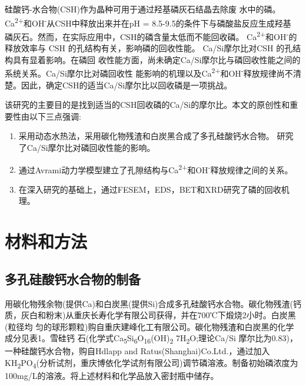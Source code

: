 \documentclass[11pt]{article}
\begin{document}
硅酸钙-水合物(CSH)作为晶种可用于通过羟基磷灰石结晶去除废
水中的磷。\cite{battistoni01_phosp_remov_from_real_anaer} Ca\textsuperscript{2+}和OH\textsuperscript{-}从CSH中释放出来并在pH = 8.5-9.5的条件下与磷酸盐反应生成羟基
磷灰石。然而，在实际应用中，CSH的磷含量太低而不能回收磷。
\cite{renman10_long_term_phosp_remov_by,de-bashan04_recen_advan_remov_phosp_from}  Ca\textsuperscript{2+}和OH\textsuperscript{-}的释放效率与
CSH \cite{yin11_phosp_remov_from_wastew_by} 的孔结构有关，影响磷的回收性能。
\cite{westholm06_subst_phosp_remov_poten_benef,baur04_dissol_precip_behav_ettrin_monos}
Ca/Si摩尔比对CSH
\cite{chen04_solub_struc_calcium_silic_hydrat,soyer-uzun11_compos_evolut_calcium_silic_hydrat,richardson04_tober_tober_hydrox_based_model}
的孔结构具有显着影响。在磷回
收性能方面，尚未确定Ca/Si摩尔比与磷回收性能之间的系统关系。Ca/Si摩尔比对磷回收性
能影响的机理以及Ca\textsuperscript{2+}和OH\textsuperscript{-}释放规律尚不清楚。因此，确定CSH的适当Ca/Si摩尔比以回收磷是一项挑战。

该研究的主要目的是找到适当的CSH回收磷的Ca/Si的摩尔比。本文的原创性和重要性由以下三点强调:
\begin{enumerate}
\item 采用动态水热法，采用碳化物残渣和白炭黑合成了多孔硅酸钙水合物。 \cite{li04_format_micro_porous_spher_partic,mansur10_prepar_charac_cytoc_bioac_coatin} 研究了Ca/Si摩尔比对磷回收性能的影响。
\item 通过Avrami动力学模型建立了孔隙结构与Ca\textsuperscript{2+}和OH\textsuperscript{-}释放规律之间的关系。
\item 在深入研究的基础上，通过FESEM，EDS，BET和XRD研究了磷的回收机理。
\end{enumerate}

\section{材料和方法}
\label{sec:orga0215d2}
\subsection{多孔硅酸钙水合物的制备}
\label{sec:org0a50eb5}
用碳化物残余物(提供Ca)和白炭黑(提供Si)合成多孔硅酸钙水合物。碳化物残渣(钙
质，灰白和粉末)从重庆长寿化学有限公司获得，并在700℃下煅烧2小时。白炭黑(粒径均
匀的球形颗粒)购自重庆建峰化工有限公司。碳化物残渣和白炭黑的化学成分见表1。雪硅钙
石(化学式Ca\textsubscript{5}Si\textsubscript{6}O\textsubscript{16}(OH)\textsubscript{2} \dot 7H\textsubscript{2}O;理论Ca/Si 摩尔比为0.83)，一种硅酸钙水合物，购自Hdlapp and Ratus(Shanghai)Co.Ltd.，通过加入KH\textsubscript{2}PO\textsubscript{4}(分析试剂，重庆博依化学试剂有限公司)调节磷溶液。制备初始磷浓度为100mg/L的溶液。将上述材料和化学品放入密封瓶中储存。
\end{document}
